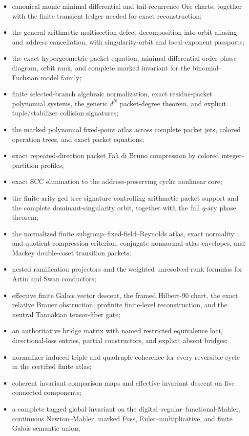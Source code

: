 \begin{itemize}
\item canonical monic minimal differential and tail-recurrence Ore charts, together with the finite transient ledger needed for exact reconstruction;
\item the general arithmetic-multisection defect decomposition into orbit aliasing and address cancellation, with singularity-orbit and local-exponent passports;
\item the exact hypergeometric packet equation, minimal differential-order phase diagram, orbit rank, and complete marked invariant for the binomial--Fuchsian model family;
\item finite selected-branch algebraic normalization, exact residue-packet polynomial systems, the generic $d^N$ packet-degree theorem, and explicit tuple/stabilizer collision signatures;
\item the marked polynomial fixed-point atlas across complete packet jets, colored operation trees, and exact packet equations;
\item exact repeated-direction packet Fa\`a di Bruno compression by colored integer-partition profiles;
\item exact SCC elimination to the address-preserving cyclic nonlinear core;
\item the finite arity-gcd tree signature controlling arithmetic packet support and the complete dominant-singularity orbit, together with the full $q$-ary phase theorem;
\item the normalized finite subgroup--fixed-field--Reynolds atlas, exact normality and quotient-compression criterion, conjugate nonnormal atlas envelopes, and Mackey double-coset transition packets;
\item nested ramification projectors and the weighted unresolved-rank formulas for Artin and Swan conductors;
\item effective finite Galois vector descent, the framed Hilbert-90 chart, the exact relative Brauer obstruction, profinite finite-level reconstruction, and the neutral Tannakian tensor-fiber gate;
\item an authoritative bridge matrix with named restricted equivalence loci, directional-loss entries, partial constructors, and explicit absent bridges;
\item normalizer-induced triple and quadruple coherence for every reversible cycle in the certified finite atlas;
\item coherent invariant comparison maps and effective invariant descent on five connected components;
\item a complete tagged global invariant on the digital--regular--functional-Mahler, continuous Newton--Mahler, marked Fuss, Euler--multiplicative, and finite Galois semantic union;

\end{itemize}
